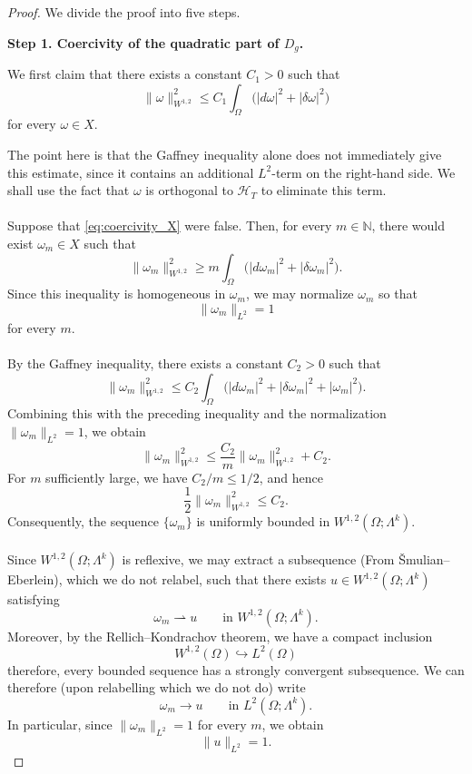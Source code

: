\begin{proof}
We divide the proof into five steps.

\medskip
\noindent\textbf{Step 1. Coercivity of the quadratic part of $D_g$.}

We first claim that there exists a constant $C_1>0$ such that
\begin{equation}\label{eq:coercivity_X}
    \|\omega\|_{W^{1,2}}^2
    \leq C_1\int_\Omega
    \bigl(|d\omega|^2+|\delta\omega|^2\bigr)
\end{equation}
for every $\omega\in X$.

The point here is that the Gaffney inequality alone does not immediately
give this estimate, since it contains an additional $L^2$-term on the
right-hand side. We shall use the fact that $\omega$ is orthogonal to
$\mathcal H_T$ to eliminate this term.
\\\\ Suppose that \eqref{eq:coercivity_X} were false. Then, for every
$m\in\mathbb N$, there would exist $\omega_m\in X$ such that
\[
    \|\omega_m\|_{W^{1,2}}^2
    \geq
    m\int_\Omega
    \bigl(|d\omega_m|^2+|\delta\omega_m|^2\bigr).
\]
Since this inequality is homogeneous in $\omega_m$, we may normalize
$\omega_m$ so that
\[
    \|\omega_m\|_{L^2}=1
\]
for every $m$.
\\\\ By the Gaffney inequality, there exists a constant
$C_2>0$ such that
\[
    \|\omega_m\|_{W^{1,2}}^2
    \leq
    C_2\int_\Omega
    \bigl(|d\omega_m|^2+|\delta\omega_m|^2
    +|\omega_m|^2\bigr).
\]
Combining this with the preceding inequality and the normalization
$\|\omega_m\|_{L^2}=1$, we obtain
\[
    \|\omega_m\|_{W^{1,2}}^2
    \leq
    \frac{C_2}{m}\|\omega_m\|_{W^{1,2}}^2+C_2.
\]
For $m$ sufficiently large, we have $C_2/m\leq 1/2$, and hence
\[
    \frac12\|\omega_m\|_{W^{1,2}}^2\leq C_2.
\]
Consequently, the sequence $\{\omega_m\}$ is uniformly bounded in
$W^{1,2}(\Omega;\Lambda^k)$.
\\\\ Since $W^{1,2}(\Omega;\Lambda^k)$ is reflexive, we may extract a
subsequence (From \v{S}mulian--Eberlein), which we do not relabel, such that there exists
$u\in W^{1,2}(\Omega;\Lambda^k)$ satisfying
\[
    \omega_m\rightharpoonup u
    \qquad\text{in }W^{1,2}(\Omega;\Lambda^k).
\]
Moreover, by the Rellich--Kondrachov theorem, we have a compact inclusion $$W^{1,2}(\Omega)\hookrightarrow L^2(\Omega) $$
therefore, every bounded sequence has a strongly convergent subsequence. We can therefore (upon relabelling which we do not do) write
\[
    \omega_m\longrightarrow u
    \qquad\text{in }L^2(\Omega;\Lambda^k).
\]
In particular, since $\|\omega_m\|_{L^2}=1$ for every $m$, we obtain
\[
    \|u\|_{L^2}=1.
\]


\end{proof}
